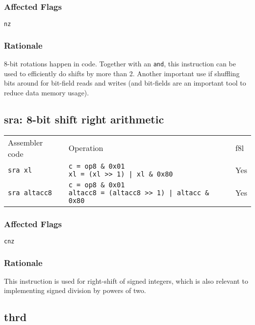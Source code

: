 \documentclass{book}
\begin{document}
\subsubsection*{Affected Flags}

\texttt{nz}

\subsubsection*{Rationale}

8-bit rotations happen in code. Together with an \texttt{and}, this instruction can be used to efficiently do shifts by more than 2. Another important use if shuffling bits around for bit-field reads and writes (and bit-fields are an important tool to reduce data memory usage).

\subsection{sra: 8-bit shift right arithmetic}

\begin{tabular}{l l l}
Assembler code       & Operation                                                                               & f8l \\
\texttt{sra xl}      & \makecell{\texttt{c = op8 \& 0x01}\\\texttt{xl = (xl >> 1) | xl \& 0x80}}               & Yes \\
\texttt{sra altacc8} & \makecell{\texttt{c = op8 \& 0x01}\\\texttt{altacc8 = (altacc8 >> 1) | altacc \& 0x80}} & Yes
\end{tabular}

\subsubsection*{Affected Flags}

\texttt{cnz}

\subsubsection*{Rationale}

This instruction is used for right-shift of signed integers, which is also relevant to implementing signed division by powers of two.

\subsection{thrd}
\end{document}
